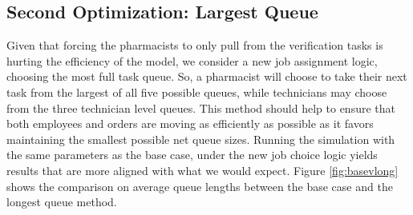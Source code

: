 \documentclass[10pt]{report}            %
\begin{document}
\subsection*{Second Optimization: Largest Queue}
Given that forcing the pharmacists to only pull from the verification tasks is hurting the efficiency of the model, we consider a new job assignment logic, choosing the most full task queue. So, a pharmacist will choose to take their next task from the largest of all five possible queues, while technicians may choose from the three technician level queues. This method should help to ensure that both employees and orders are moving as efficiently as possible as it favors maintaining the smallest possible net queue sizes. Running the simulation with the same parameters as the base case, under the new job choice logic yields results that are more aligned with what we would expect. Figure \ref{fig:basevlong} shows the comparison on average queue lengths between the base case and the longest queue method.
\end{document}

